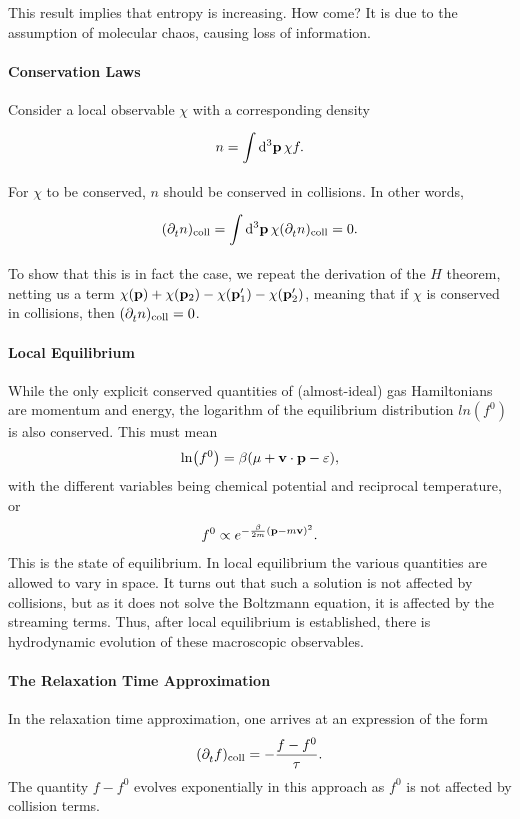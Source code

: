 This result implies that entropy is increasing. How come? It is due to the assumption of molecular chaos, causing loss of information.

\paragraph{Conservation Laws}
Consider a local observable $\chi$ with a corresponding density
\begin{align*}
	n = \int\limits_{}^{}\dd[3]{\vb{p}}\chi f.
\end{align*}
For $\chi$ to be conserved, $n$ should be conserved in collisions. In other words,
\begin{align*}
	(\partial^{}_{t}n)_{\text{coll}} = \int\limits_{}^{}\dd[3]{\vb{p}}\chi (\partial^{}_{t}n)_{\text{coll}} = 0.
\end{align*}
To show that this is in fact the case, we repeat the derivation of the $H$ theorem, netting us a term $\chi(\vb{p}) + \chi(\vb{p}_{2}) - \chi(\vb{p}_{1}^{\prime}) - \chi(\vb{p}_{2}^{\prime})$, meaning that if $\chi$ is conserved in collisions, then $(\partial^{}_{t}n)_{\text{coll}} = 0$.

\paragraph{Local Equilibrium}
While the only explicit conserved quantities of (almost-ideal) gas Hamiltonians are momentum and energy, the logarithm of the equilibrium distribution $ln(f^{0})$ is also conserved. This must mean
\begin{align*}
	\ln(f^{0}) = \beta(\mu + \vb{v}\cdot\vb{p} - \varepsilon),
\end{align*}
with the different variables being chemical potential and reciprocal temperature, or
\begin{align*}
	f^{0} \propto e^{-\frac{\beta}{2m}(\vb{p} - m\vb{v})^{2}}.
\end{align*}
This is the state of equilibrium. In local equilibrium the various quantities are allowed to vary in space. It turns out that such a solution is not affected by collisions, but as it does not solve the Boltzmann equation, it is affected by the streaming terms. Thus, after local equilibrium is established, there is hydrodynamic evolution of these macroscopic observables.

\paragraph{The Relaxation Time Approximation}
In the relaxation time approximation, one arrives at an expression of the form
\begin{align*}
	(\partial^{}_{t}f)_{\text{coll}} = -\frac{f - f^{0}}{\tau}.
\end{align*}
The quantity $f - f^{0}$ evolves exponentially in this approach as $f^{0}$ is not affected by collision terms.